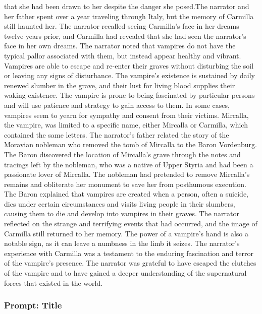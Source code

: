 \documentclass{article} %
\begin{document}
that she had been drawn to her despite the danger she posed.The narrator and her father spent over a year traveling through Italy, but the memory of Carmilla still haunted her. \textcolor{skipred}{The narrator recalled seeing Carmilla's face in her dreams twelve years prior, and Carmilla had revealed that she had seen the narrator's face in her own dreams.} The narrator noted that vampires do not have the typical pallor associated with them, but instead appear healthy and vibrant.  Vampires are able to escape and re-enter their graves without disturbing the soil or leaving any signs of disturbance. The vampire's existence is sustained by daily renewed slumber in the grave, and their lust for living blood supplies their waking existence. The vampire is prone to being fascinated by particular persons and will use patience and strategy to gain access to them.  In some cases, vampires seem to yearn for sympathy and consent from their victims. Mircalla, the vampire, was limited to a specific name, either Mircalla or Carmilla, which contained the same letters. The narrator's father related the story of the Moravian nobleman who removed the tomb of Mircalla to the Baron Vordenburg.  The Baron discovered the location of Mircalla's grave through the notes and tracings left by the nobleman, who was a native of Upper Styria and had been a passionate lover of Mircalla. The nobleman had pretended to remove Mircalla's remains and obliterate her monument to save her from posthumous execution.  The Baron explained that vampires are created when a person, often a suicide, dies under certain circumstances and visits living people in their slumbers, causing them to die and develop into vampires in their graves. The narrator reflected on the strange and terrifying events that had occurred, and the image of Carmilla still returned to her memory.  The power of a vampire's hand is also a notable sign, as it can leave a numbness in the limb it seizes. The narrator's experience with Carmilla was a testament to the enduring fascination and terror of the vampire's presence. The narrator was grateful to have escaped the clutches of the vampire and to have gained a deeper understanding of the supernatural forces that existed in the world.

\subsubsection{Prompt: Title}
\end{document}
